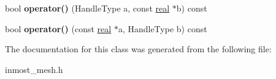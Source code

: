 \begin{DoxyCompactItemize}
\item 
\hypertarget{classINMOST_1_1Mesh_1_1CentroidComparator_a87611f52f9a70715d254613f3d580436}{bool {\bfseries operator()} (Handle\-Type a, const \hyperlink{classINMOST_1_1Storage_a853346784b4a5822a7fac54d8f10f805}{real} $\ast$b) const }\label{classINMOST_1_1Mesh_1_1CentroidComparator_a87611f52f9a70715d254613f3d580436}

\item 
\hypertarget{classINMOST_1_1Mesh_1_1CentroidComparator_af2bdd77d155ad58ab12908b49f8e2296}{bool {\bfseries operator()} (const \hyperlink{classINMOST_1_1Storage_a853346784b4a5822a7fac54d8f10f805}{real} $\ast$a, Handle\-Type b) const }\label{classINMOST_1_1Mesh_1_1CentroidComparator_af2bdd77d155ad58ab12908b49f8e2296}

\end{DoxyCompactItemize}


The documentation for this class was generated from the following file\-:\begin{DoxyCompactItemize}
\item 
inmost\-\_\-mesh.\-h\end{DoxyCompactItemize}

